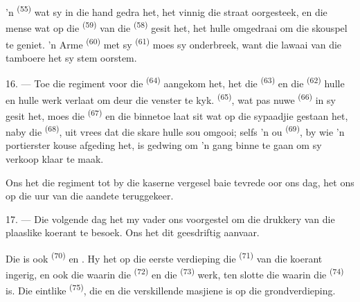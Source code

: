 \VUsaut{3.0mm}

'n  \textsuperscript{(55)} wat sy  in die
hand gedra het, het vinnig die straat oorgesteek, en die mense wat op die
 \textsuperscript{(59)} van die  \textsuperscript{(58)}
gesit het, het hulle omgedraai om die skouspel te geniet. 'n Arme 
\textsuperscript{(60)} met sy  \textsuperscript{(61)} moes sy
 onderbreek, want die lawaai van die tamboere het sy stem oorstem.

16. --- Toe die regiment voor die  \textsuperscript{(64)} aangekom
het, het die  \textsuperscript{(63)} en die 
\textsuperscript{(62)} hulle  en hulle werk verlaat om deur die
venster te kyk.  \textsuperscript{(65)}, wat pas nuwe
 \textsuperscript{(66)} in sy  gesit het, moes die
 \textsuperscript{(67)} en die  binnetoe laat sit wat op die
sypaadjie gestaan het, naby die  \textsuperscript{(68)}, uit vrees
dat die skare hulle sou omgooi; selfs 'n ou  \textsuperscript{(69)}, by wie
'n portierster kouse afgeding het, is gedwing om 'n gang binne te gaan om sy verkoop
klaar te maak.

Ons het die regiment tot by die kaserne vergesel  baie tevrede oor ons dag,
het ons op die uur van die aandete teruggekeer.

\VUsaut{3.0mm}

17. --- Die volgende dag het my vader ons voorgestel om die drukkery van die plaaslike
koerant te besoek. Ons het dit geesdriftig aanvaar.

Die  is ook  \textsuperscript{(70)}
   en
. Hy het op die eerste verdieping die 
\textsuperscript{(71)} van die koerant ingerig, en ook die 
waarin die  \textsuperscript{(72)} en die 
\textsuperscript{(73)} werk, ten slotte die  waarin die
 \textsuperscript{(74)} is. Die eintlike 
\textsuperscript{(75)}, die  en die verskillende masjiene is op die
grondverdieping.


